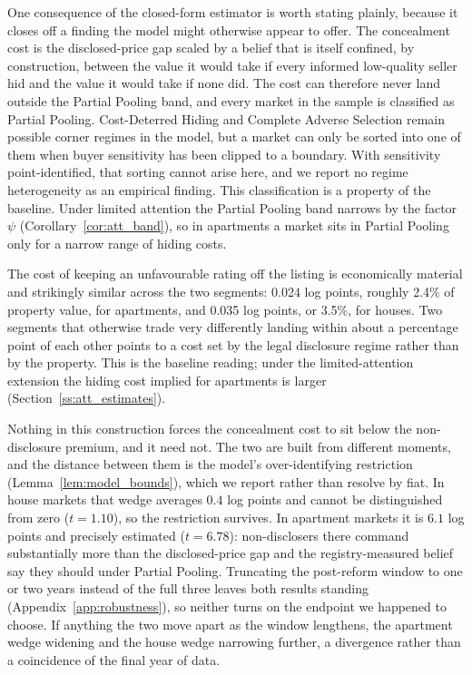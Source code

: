 One consequence of the closed-form estimator is worth stating plainly, because it closes off a
finding the model might otherwise appear to offer. The concealment cost is the disclosed-price
gap scaled by a belief that is itself confined, by construction, between the value it would take
if every informed low-quality seller hid and the value it would take if none did. The cost can
therefore never land outside the Partial Pooling band, and every market in the sample is
classified as Partial Pooling. Cost-Deterred Hiding and Complete Adverse Selection remain
possible corner regimes in the model, but a market can only be sorted into one of them when
buyer sensitivity has been clipped to a boundary. With sensitivity point-identified, that
sorting cannot arise here, and we report no regime heterogeneity as an empirical finding. This classification is a property of the baseline. Under limited attention the Partial Pooling band narrows by the factor $\psi$ (Corollary~\ref{cor:att_band}), so in apartments a market sits in Partial Pooling only for a narrow range of hiding costs.

The cost of keeping an unfavourable rating off the listing is economically material and
strikingly similar across the two segments: 0.024 log points, roughly 2.4\% of property value,
for apartments, and 0.035 log points, or 3.5\%, for houses. Two segments that otherwise trade
very differently landing within about a percentage point of each other points to a cost set by
the legal disclosure regime rather than by the property. This is the baseline reading; under the limited-attention extension the hiding cost implied for apartments is larger (Section~\ref{ss:att_estimates}).

Nothing in this construction forces the concealment cost to sit below the non-disclosure premium,
and it need not. The two are built from different moments, and the distance between them is the
model's over-identifying restriction (Lemma~\ref{lem:model_bounds}), which we report rather than
resolve by fiat. In house markets that wedge averages $0.4$ log points and cannot be
distinguished from zero ($t=1.10$), so the restriction survives. In apartment markets it is $6.1$
log points and precisely estimated ($t=6.78$): non-disclosers there command substantially more
than the disclosed-price gap and the registry-measured belief say they should under Partial
Pooling. Truncating the post-reform window to one or two years instead of the full three leaves
both results standing (Appendix~\ref{app:robustness}), so neither turns on the endpoint we
happened to choose. If anything the two move apart as the window lengthens, the apartment wedge
widening and the house wedge narrowing further, a divergence rather than a coincidence of the
final year of data.

